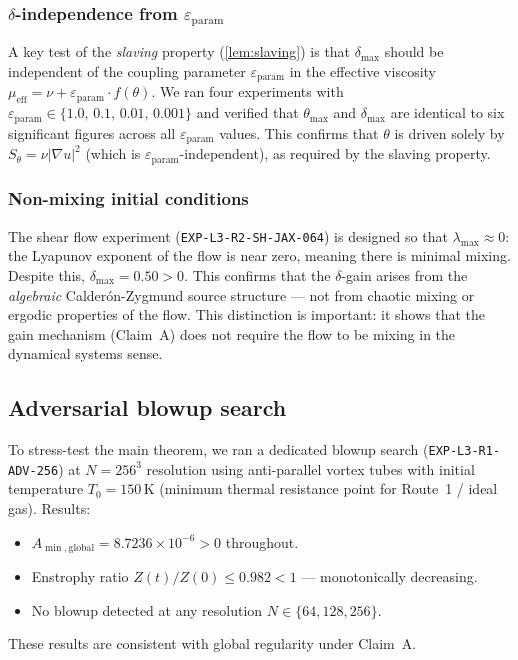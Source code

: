 \documentclass[12pt]{article}
\theoremstyle{plain}
\theoremstyle{definition}
\theoremstyle{remark}
\newcommand{\abs}[1]{\left|#1\right|}
\newcommand{\eps}{\varepsilon}
\newcommand{\grad}{\nabla}
\begin{document}
\subsubsection*{$\delta$-independence from $\eps_{\mathrm{param}}$}

A key test of the \emph{slaving} property (\cref{lem:slaving}) is that
$\delta_{\max}$ should be independent of the coupling parameter $\eps_{\mathrm{param}}$
in the effective viscosity $\mu_{\mathrm{eff}}=\nu+\eps_{\mathrm{param}}\cdot f(\theta)$.
We ran four experiments with $\eps_{\mathrm{param}}\in\{1.0,\,0.1,\,0.01,\,0.001\}$
and verified that $\theta_{\max}$ and $\delta_{\max}$ are identical to six significant
figures across all $\eps_{\mathrm{param}}$ values.
This confirms that $\theta$ is driven solely by $S_\theta=\nu\abs{\grad u}^2$
(which is $\eps_{\mathrm{param}}$-independent), as required by the slaving property.

\subsubsection*{Non-mixing initial conditions}

The shear flow experiment (\texttt{EXP-L3-R2-SH-JAX-064}) is designed so that
$\lambda_{\max}\approx 0$: the Lyapunov exponent of the flow is near zero,
meaning there is minimal mixing.
Despite this, $\delta_{\max}=0.50>0$.
This confirms that the $\delta$-gain arises from the \emph{algebraic} Calderón-Zygmund
source structure — not from chaotic mixing or ergodic properties of the flow.
This distinction is important: it shows that the gain mechanism (Claim~A) does not
require the flow to be mixing in the dynamical systems sense.

\subsection{Adversarial blowup search}

To stress-test the main theorem, we ran a dedicated blowup search
(\texttt{EXP-L3-R1-ADV-256}) at $N=256^3$ resolution using anti-parallel vortex tubes
with initial temperature $T_0=150\,\mathrm{K}$ (minimum thermal resistance point
for Route~1 / ideal gas).
Results:
\begin{itemize}[leftmargin=2em]
  \item $A_{\min,\mathrm{global}} = 8.7236\times 10^{-6} > 0$ throughout.
  \item Enstrophy ratio $Z(t)/Z(0) \leq 0.982 < 1$ — monotonically decreasing.
  \item No blowup detected at any resolution $N\in\{64,128,256\}$.
\end{itemize}
These results are consistent with global regularity under Claim~A.
\end{document}
